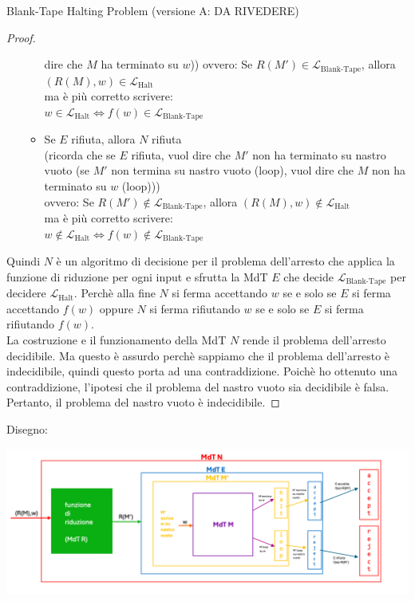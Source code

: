 \documentclass{article}  %
\theoremstyle{definition}
\begin{document}
\begin{theorem}{Blank-Tape Halting Problem (versione A: DA RIVEDERE)}
\begin{proof}
\begin{enumerate}
\begin{itemize}
        dire che $M$ ha terminato su $w$))
        ovvero: Se $R(M') \in \mathcal{L}_{\text{Blank-Tape}}$, allora $(R(M),w) \in \mathcal{L}_{\text{Halt}}$ \\
        ma è più corretto scrivere: \\
        $w \in \mathcal{L}_{\text{Halt}} \iff  f(w) \in \mathcal{L}_{\text{Blank-Tape}}$
        \item Se $E$ rifiuta, allora $N$ rifiuta \\
        (ricorda che se $E$ rifiuta, vuol dire che $M'$ non ha terminato su nastro vuoto (se $M'$ non termina su nastro vuoto (loop), vuol
        dire che $M$ non ha terminato su $w$ (loop))) \\ 
        ovvero: Se $R(M') \notin \mathcal{L}_{\text{Blank-Tape}}$, allora $(R(M),w) \notin \mathcal{L}_{\text{Halt}}$ \\
        ma è più corretto scrivere: \\
        $w \notin \mathcal{L}_{\text{Halt}} \iff f(w) \notin \mathcal{L}_{\text{Blank-Tape}}$
      \end{itemize} 
    \end{enumerate}
  Quindi $N$ è un algoritmo di decisione per il problema dell'arresto che applica la funzione di riduzione per ogni input e sfrutta
  la MdT $E$ che decide $\mathcal{L}_{\text{Blank-Tape}}$ per decidere $\mathcal{L}_{\text{Halt}}$. Perchè alla fine $N$ si ferma
  accettando $w$ se e solo se $E$ si ferma accettando $f(w)$ oppure $N$ si ferma
  rifiutando $w$ se e solo se $E$ si ferma rifiutando $f(w)$. \\
  La costruzione e il funzionamento della MdT $N$ rende il problema dell'arresto decidibile. Ma questo è assurdo perchè sappiamo
  che il problema dell'arresto è indecidibile, quindi questo porta ad una contraddizione. Poichè ho ottenuto una contraddizione, l'ipotesi 
  che il problema del nastro vuoto sia decidibile è falsa. Pertanto, il problema del nastro vuoto è indecidibile. 
  \end{proof}
  Disegno: \\
    \begin{center}
    \includegraphics[width=0.9\linewidth]{BTHP.png}
  \end{center}
\end{theorem}
\end{document}
